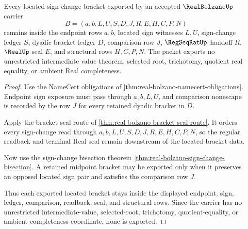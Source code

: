 \begin{theorem}
\label{thm:real-bolzano-located-bracket-nonescape}
Every located sign-change bracket exported by an accepted $\RealBolzanoUp$ carrier
$$
B=(a,b,L,U,S,D,J,R,E,H,C,P,N)
$$
remains inside the endpoint rows $a,b$, located sign witnesses $L,U$, sign-change ledger $S$, dyadic bracket ledger $D$, comparison row $J$, $\RegSeqRatUp$ handoff $R$, $\RealUp$ seal $E$, and structural rows $H,C,P,N$. The packet exports no unrestricted intermediate value theorem, selected root, trichotomy, quotient real equality, or ambient Real completeness.
\end{theorem}
\begin{proof}
Use the NameCert obligations of \autoref{thm:real-bolzano-namecert-obligations}. Endpoint sign exposure must pass through $a,b,L,U$, and comparison nonescape is recorded by the row $J$ for every retained dyadic bracket in $D$.

Apply the bracket seal route of \autoref{thm:real-bolzano-bracket-seal-route}. It orders every sign-change read through $a,b,L,U,S,D,J,R,E,H,C,P,N$, so the regular readback and terminal Real seal remain downstream of the located bracket data.

Now use the sign-change bisection theorem \autoref{thm:real-bolzano-sign-change-bisection}. A retained midpoint bracket may be exported only when it preserves an opposed located sign pair and satisfies the comparison row $J$.

Thus each exported located bracket stays inside the displayed endpoint, sign, ledger, comparison, readback, seal, and structural rows. Since the carrier has no unrestricted intermediate-value, selected-root, trichotomy, quotient-equality, or ambient-completeness coordinate, none is exported.
\end{proof}



